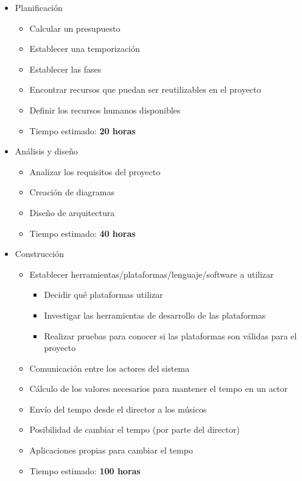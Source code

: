 \begin{itemize}
  \item Planificación
  \begin{itemize}
    \item{Calcular un presupuesto}
    \item{Establecer una temporización}
    \item{Establecer las fases}
    \item{Encontrar recursos que puedan ser reutilizables en el proyecto}
    \item{Definir los recursos humanos disponibles}
    \item{Tiempo estimado: \textbf{20 horas}}
  \end{itemize}
\end{itemize}

\begin{itemize}
  \item Análisis y diseño
  \begin{itemize}
    \item{Analizar los requisitos del proyecto}
    \item{Creación de diagramas}
    \item{Diseño de arquitectura}
    \item{Tiempo estimado: \textbf{40 horas}}
  \end{itemize}
\end{itemize}


\begin{itemize}
  \item Construcción
  \begin{itemize}
    \item{Establecer herramientas/plataformas/lenguaje/software a utilizar}
      \begin{itemize}
        \item{Decidir qué plataformas utilizar}
        \item{Investigar las herramientas de desarrollo de las plataformas}
        \item{Realizar pruebas para conocer si las plataformas son válidas para el proyecto}
      \end{itemize}
    \item{Comunicación entre los actores del sistema}
    \item{Cálculo de los valores necesarios para mantener el tempo en un actor}
    \item{Envío del tempo desde el director a los músicos}
    \item{Posibilidad de cambiar el tempo (por parte del director)}
    \item{Aplicaciones propias para cambiar el tempo}
    \item{Tiempo estimado: \textbf{100 horas}}
  \end{itemize}
\end{itemize}

